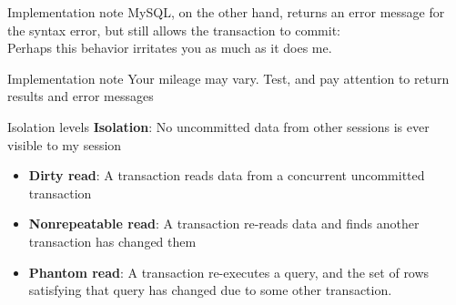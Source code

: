 \documentclass[svgnames]{beamer}
\begin{document}
\begin{frame}{Implementation note}
    MySQL, on the other hand, returns an error message for the syntax error,
    but still allows the transaction to commit: \\
    \vspace{10pt}
    \small {
    }
    \vspace{10pt}
    Perhaps this behavior irritates you as much as it does me.
\end{frame}

\begin{frame}{Implementation note}
    Your mileage may vary. Test, and pay attention to return results and error
    messages
\end{frame}

\begin{frame}{Isolation levels}
    \textbf{Isolation}: No uncommitted data from other sessions is ever visible to my session
    \begin{itemize}
        \item \textbf{Dirty read}: A transaction reads data from a
        concurrent uncommitted transaction
        \item \textbf{Nonrepeatable read}: A transaction re-reads data and
        finds another transaction has changed them
        \item \textbf{Phantom read}: A transaction re-executes a query, and
        the set of rows satisfying that query has changed due to some other
        transaction.
    \end{itemize}
\end{frame}
\end{document}
